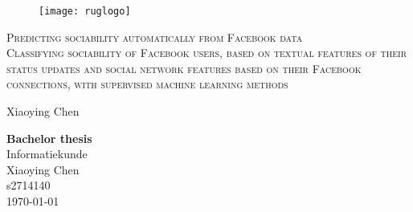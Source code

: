 \documentclass[
10pt, %
a4paper, %
oneside, %
headinclude,footinclude, %
] {book}%
\title{\normalfont\spacedallcaps{title}} %
\author{\spacedlowsmallcaps{author}} %
\date{} %
\begin{document}


\pagestyle{scrheadings} %



\hypersetup{pageanchor=false}
\begin{titlepage}
\thispagestyle{empty}
\begin{figure}[h!] %
\texttt{[image: ruglogo]} 
\end{figure}

\begin{center}
\vspace{30 mm}
\begingroup \linespread{1,75} \selectfont 
\textsc{\LARGE Predicting sociability automatically from Facebook data}\\
\textsc{\large Classifying sociability of Facebook users, based on textual features of their status updates and social network features based on their Facebook connections, with supervised machine learning methods}\\[1,25cm]
\endgroup

Xiaoying Chen\\[2,5cm]

\end{center}
\vfill
\textbf{Bachelor thesis}\\  %
Informatiekunde\\  %
Xiaoying Chen\\
s2714140\\
\today
\end{titlepage}
\hypersetup{pageanchor=true}
\end{document}
